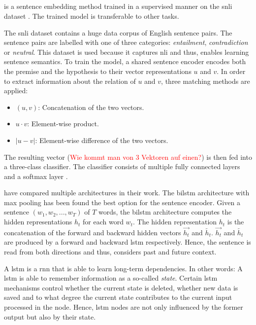 \subsection{\infersent{}}\label{subsec:inferSent}

\infersent{} is a sentence embedding method trained in a supervised manner on the \ac{snli} dataset \cite{inferSent2018}.
The trained model is transferable to other tasks.

The \ac{snli} dataset contains a huge data corpus of English sentence pairs.
The sentence pairs are labelled with one of three categories: \textit{entailment}, \textit{contradiction} or \textit{neutral}.
This dataset is used because it captures \ac{nli} and thus, enables learning sentence semantics.
To train the model, a shared sentence encoder encodes both the premise and the hypothesis to their vector representations $u$ and $v$.
In order to extract information about the relation of $u$ and $v$, three matching methods are applied:

\begin{itemize}
    \item $(u,v)$: Concatenation of the two vectors.
    \item $u \cdot v$: Element-wise product.
    \item $|u - v|$: Element-wise difference of the two vectors.
\end{itemize}

The resulting vector (\textcolor{red}{Wie kommt man von 3 Vektoren auf einen?}) is then fed into a three-class classifier.
The classifier consists of multiple fully connected layers and a softmax layer \cite{inferSent2018}.

\citeauthor{inferSent2018} have compared multiple architectures in their work.
The \ac{bilstm} architecture with max pooling has been found the best option for the sentence encoder.
Given a sentence $(w_1, w_2, ..., w_T)$ of $T$ words, the \ac{bilstm} architecture computes the hidden representations $h_t$ for each word $w_t$.
The hidden representation $h_t$ is the concatenation of the forward and backward hidden vectors $\overrightarrow{h_t}$ and $\overleftarrow{h_t}$.
$\overrightarrow{h_t}$ and $\overleftarrow{h_t}$ are produced by a forward and backward \ac{lstm} respectively.
Hence, the sentence is read from both directions and thus, considers past and future context.

A \ac{lstm} is a \ac{rnn} that is able to learn long-term dependencies.
In other words: 
A \ac{lstm} is able to remember information as a so-called \textit{state}.
Certain \ac{lstm} mechanisms control whether the current state is deleted, whether new data is saved and 
to what degree the current state contributes to the current input processed in the node.
Hence, \ac{lstm} nodes are not only influenced by the former output but also by their state.

